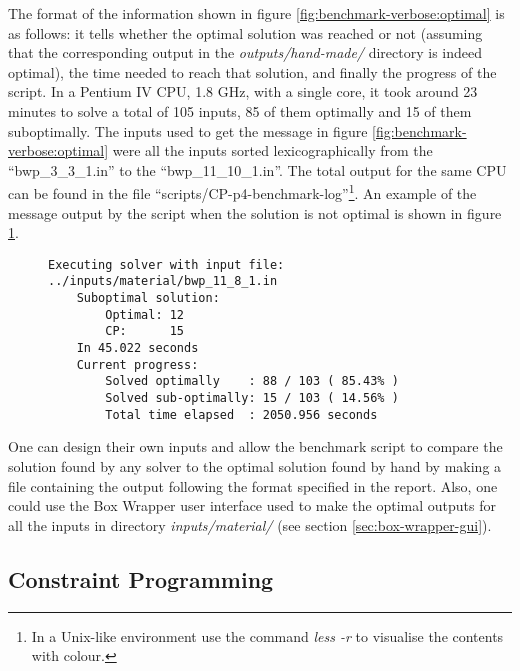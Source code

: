 The format of the information shown in figure \ref{fig:benchmark-verbose:optimal}
is as follows: it tells whether the optimal solution was reached or not (assuming
that the corresponding output in the \textit{outputs/hand-made/} directory is indeed
optimal), the time needed to reach that solution, and finally the progress of the
script. In a Pentium IV CPU, 1.8 GHz, with a single core, it took around 23 minutes
to solve a total of 105 inputs, 85 of them optimally and 15 of them suboptimally.
The inputs used to get the message in figure \ref{fig:benchmark-verbose:optimal} were
all the inputs sorted lexicographically from the ``bwp\_3\_3\_1.in'' to the
``bwp\_11\_10\_1.in''. The total output for the same CPU can be found
in the file ``scripts/CP-p4-benchmark-log''\footnote{ In a Unix-like environment use
the command \textit{less -r} to visualise the contents with colour.}.
An example of the message output by the script when the solution is not optimal is
shown in figure \ref{fig:benchmark-verbose:suboptimal}.

\begin{figure}[H]
\centering
\begin{BVerbatim}
Executing solver with input file: ../inputs/material/bwp_11_8_1.in
    Suboptimal solution:
        Optimal: 12
        CP:      15
    In 45.022 seconds
    Current progress:
        Solved optimally    : 88 / 103 ( 85.43%
        Solved sub-optimally: 15 / 103 ( 14.56%
        Total time elapsed  : 2050.956 seconds
\end{BVerbatim}
\label{fig:benchmark-verbose:suboptimal}
\end{figure}

\hfill

One can design their own inputs and allow the benchmark script to compare
the solution found by any solver to the optimal solution found by hand by
making a file containing the output following the format specified in the
report. Also, one could use the Box Wrapper user interface used to make the
optimal outputs for all the inputs in directory \textit{inputs/material/}
(see section \ref{sec:box-wrapper-gui}).

\subsection{Constraint Programming}
\label{sec:benchmarking:constraint-programming}

